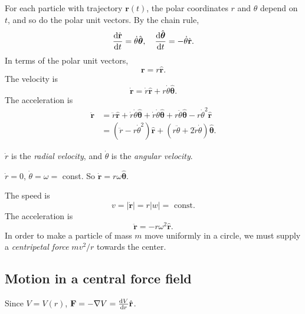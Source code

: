 \documentclass[a4paper]{article}
\begin{document}
\begin{prop}
  For each particle with trajectory $\mathbf{r}(t)$, the polar coordinates $r$ and $\theta$ depend on $t$, and so do the polar unit vectors. By the chain rule,
  \[
    \frac{\mathrm{d} \hat{\mathbf{r}}}{\mathrm{d} t} = \dot{\theta}\hat{\boldsymbol\theta},\quad \frac{\mathrm{d} \hat{\boldsymbol\theta}}{\mathrm{d} t} = -\dot{\theta} \hat{\mathbf{r}}.
  \]
  In terms of the polar unit vectors, 
  \[
    \mathbf{r} = r\hat{\mathbf{r}}.
  \]
  The velocity is
  \[
    \dot{\mathbf{r}} = \dot{r} \hat{\mathbf{r}} + r\dot{\theta} \hat{\boldsymbol\theta}.
  \]
  The acceleration is
  \begin{align*}
    \ddot{\mathbf{r}} &= \ddot{r} \hat{\mathbf{r}} + \dot{r}\dot{\theta}\hat{\boldsymbol\theta} + \dot{r}\dot{\theta}\hat{\boldsymbol\theta} + r\ddot{\theta}\hat{\boldsymbol\theta} - r\dot{\theta}^2\hat{\mathbf{r}}\\
    &= (\ddot{r} - r\dot{\theta}^2)\hat{\mathbf{r}} + (r\ddot{\theta} + 2\dot{r}\dot{\theta})\hat{\boldsymbol\theta}.
  \end{align*}
\end{prop}

\begin{defi}
  $\dot{r}$ is the \emph{radial velocity}, and $\dot{\theta}$ is the \emph{angular velocity}.
\end{defi}

\begin{eg}
  $\dot{r} = 0$, $\dot{\theta} = \omega = $ const.  So $\dot{\mathbf{r}} = r\omega\hat{\boldsymbol\theta}$.

  The speed is 
  \[
    v = |\dot{\mathbf{r}}| = r|w| = \text{ const}.
  \]
  The acceleration is
  \[
    \ddot{\mathbf{r}} = -r\omega^2 \hat{\mathbf{r}}.
  \]
  In order to make a particle of mass $m$ move uniformly in a circle, we must supply a \emph{centripetal force} $mv^2/r$ towards the center.
\end{eg}

\subsection{Motion in a central force field}
Since $V = V(r)$, $\mathbf{F} = -\nabla V = \frac{\mathrm{d} V}{\mathrm{d} r} \hat{\mathbf{r}}$.
\end{document}
